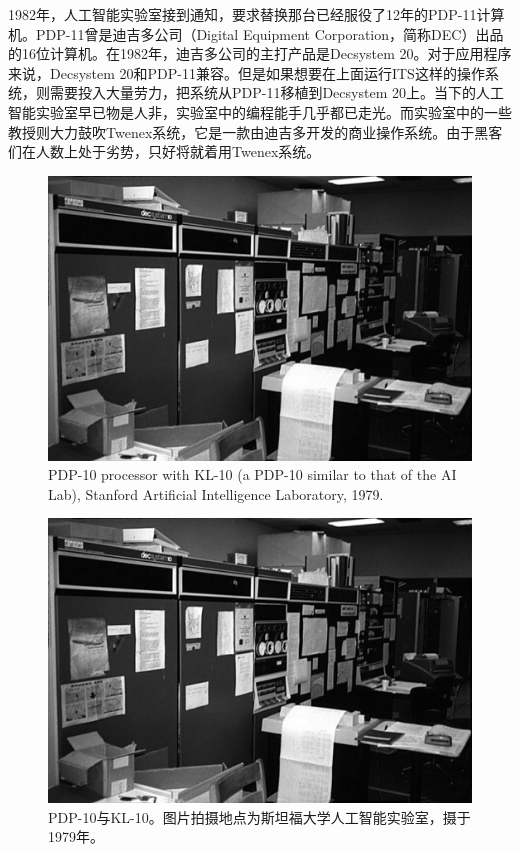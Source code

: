 \ifdefined\chs
1982年，人工智能实验室接到通知，要求替换那台已经服役了12年的PDP-11计算机。PDP-11曾是迪吉多公司（Digital Equipment Corporation，简称DEC）出品的16位计算机。在1982年，迪吉多公司的主打产品是Decsystem 20。对于应用程序来说，Decsystem 20和PDP-11兼容。但是如果想要在上面运行ITS这样的操作系统，则需要投入大量劳力，把系统从PDP-11移植到Decsystem 20上。当下的人工智能实验室早已物是人非，实验室中的编程能手几乎都已走光。而实验室中的一些教授则大力鼓吹Twenex系统，它是一款由迪吉多开发的商业操作系统。由于黑客们在人数上处于劣势，只好将就着用Twenex系统。
\fi

\ifdefined\eng
\begin{figure}[ht] \centering
  \includegraphics{KL10_1979}
  \caption{PDP-10 processor with KL-10 (a PDP-10 similar to that of the AI Lab), Stanford Artificial Intelligence Laboratory, 1979.}
\end{figure}
\fi

\ifdefined\chs
\begin{figure}[ht] \centering
  \includegraphics{KL10_1979}
  \caption{PDP-10与KL-10。图片拍摄地点为斯坦福大学人工智能实验室，摄于1979年。}
\end{figure}
\fi
\fi

